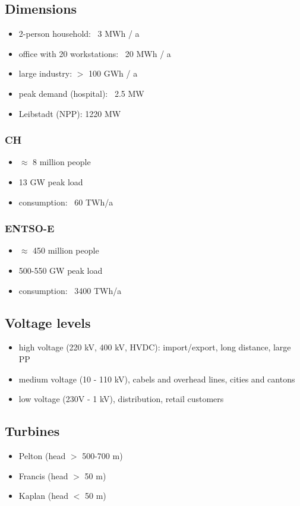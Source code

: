 \documentclass[fs, footer]{latex4ei}
\begin{document}
\begin{multicols*}{4}
 \subsection*{Dimensions}
 \begin{itemize}
  	\item 2-person household: ~3 MWh / a
  	\item office with 20 workstations: ~20 MWh / a
  	\item large industry: $>$ 100 GWh / a
  	\item peak demand (hospital): ~2.5 MW
  	\item Leibstadt (NPP): 1220 MW
  \end{itemize} 

 \subsubsection*{CH}
 \begin{itemize}
 	\item  $\approx$ 8 million people
 	\item 13 GW peak load
 	\item consumption: ~60 TWh/a
 \end{itemize}
  \subsubsection*{ENTSO-E}
 \begin{itemize}
 	\item  $\approx$ 450 million people
 	\item 500-550 GW peak load
 	\item consumption: ~3400 TWh/a
 \end{itemize}

\subsection*{Voltage levels}
\begin{itemize}
 	\item high voltage (220 kV, 400 kV, HVDC): import/export, long distance, large PP
 	\item medium voltage (10 - 110 kV), cabels and overhead lines, cities and cantons
 	\item low voltage (230V - 1 kV), distribution, retail customers
 \end{itemize} 

 \subsection*{Turbines}
 \begin{itemize}
  	\item Pelton (head $>$ 500-700 m)
  	\item Francis (head $>$ 50 m)
  	\item Kaplan (head $<$ 50 m)
  \end{itemize} 


\end{multicols*}
\end{document}

